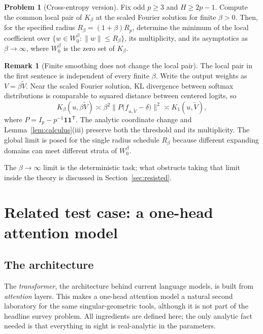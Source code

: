 \documentclass[11pt]{amsart}
\theoremstyle{plain}
\theoremstyle{definition}
\newtheorem{problem}[theorem]{Problem}
\newtheorem{remark}[theorem]{Remark}
\begin{document}
\begin{problem}[Cross-entropy version]\label{prob:xent}
Fix odd $p \ge 3$ and $H \ge 2p-1$. Compute the common local pair of $K_\beta$ at the scaled Fourier solution for finite $\beta>0$. Then, for the specified radius $R_\beta=(1+\beta)R_p$, determine the minimum of the local coefficient over $\{w\in W_0^\beta:\|w\|\le R_\beta\}$, its multiplicity, and its asymptotics as $\beta\to\infty$, where $W_0^\beta$ is the zero set of $K_\beta$.
\end{problem}

\begin{remark}[Finite smoothing does not change the local pair]
The local pair in the first sentence is independent of every finite $\beta$. Write the output weights as $V=\beta\widetilde V$. Near the scaled Fourier solution, KL divergence between softmax distributions is comparable to squared distance between centered logits, so
\[
 K_\beta(u,\beta\widetilde V)\asymp
 \beta^2\bigl\|P\bigl(f_{u,\widetilde V}-\delta\bigr)\bigr\|^2
 \asymp K_1(u,\widetilde V),
\]
where $P=I_p-p^{-1}\mathbf1\mathbf1^{\mathsf T}$. The analytic coordinate change and Lemma~\ref{lem:calculus}(iii) preserve both the threshold and its multiplicity. The global limit is posed for the single radius schedule $R_\beta$ because different expanding domains can meet different strata of $W_0^\beta$.
\end{remark}

The $\beta \to \infty$ limit is the deterministic task; what obstructs taking that limit inside the theory is discussed in Section~\ref{sec:resisted}.

\section{Related test case: a one-head attention model}\label{sec:attention}

\subsection{The architecture}

The \emph{transformer}, the architecture behind current language models, is built from \emph{attention} layers. This makes a one-head attention model a natural second laboratory for the same singular-geometric tools, although it is not part of the headline survey problem. All ingredients are defined here; the only analytic fact needed is that everything in sight is real-analytic in the parameters.
\end{document}
